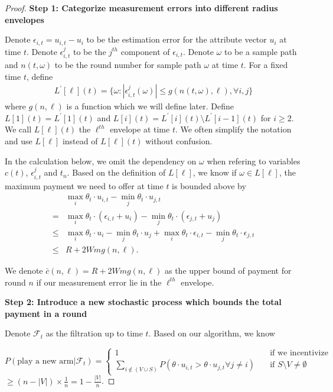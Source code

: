 \begin{proof}

\noindent\textbf{Step 1: Categorize measurement errors into different radius envelopes}


Denote $\epsilon_{i,t}=u_{i,t}-u_{i}$ to be the estimation error for the attribute vector $u_i$ at time $t$. Denote $\epsilon_{i,t}^{j}$ to be the $j^{th}$ component of $\epsilon_{i,t}$. Denote $\omega$ to be a sample path and $n(t,\omega)$ to be the round number for sample path $\omega$ at time $t$. For a fixed time $t$, define
\begin{align}
L^{'}[\ell](t) = \{\omega:|\epsilon_{i,t}^{j}(\omega)|\leq g(n(t,\omega),\ell), \forall i,j\}\nonumber
\end{align}
where $g(n,\ell)$ is a function which we will define later. Define $L[1](t) = L^{'}[1](t)$ and $L[i](t) = L^{'}[i](t)\setminus L^{'}[i-1](t)$ for $i\geq 2$. We call $L[\ell](t)$ the $\ell^{th}$ envelope at time $t$. We often simplify the notation and use $L[\ell]$ instead of $L[\ell](t)$ without confusion.

In the calculation below, we omit the dependency on $\omega$ when refering to variables $c(t)$, $\epsilon_{i,t}^{j}$ and $t_n$. Based on the definition of $L[\ell]$, we know if $\omega\in L[\ell]$, the maximum payment we need to offer at time $t$ is bounded above by 
\begin{align}
&\max_{i}\theta_t\cdot u_{i,t} - \min_{j}\theta_t\cdot u_{j,t} \nonumber \\
= &\max_{i}\theta_t\cdot (\epsilon_{i,t}+u_i) - \min_{j}\theta_t\cdot (\epsilon_{j,t}+u_j) \nonumber \\
\leq &\max_{i}\theta_t\cdot u_i - \min_{j}\theta_t\cdot u_j +\max_{i}\theta_t\cdot \epsilon_{i,t} - \min_{j}\theta_t\cdot \epsilon_{j,t}\nonumber \\
\leq & R + 2Wmg(n,\ell). \nonumber
\end{align}

We denote $\bar{c}(n,\ell)=R + 2Wmg(n,\ell)$ as the upper bound of payment for round $n$ if our measurement error lie in the $\ell^{th}$ envelope.


\noindent\textbf{Step 2: Introduce a new stochastic process which bounds the total payment in a round}

Denote $\mathcal{F}_t$ as the filtration up to time $t$. Based on our algorithm, we know

\[ P(\text{play a new arm}|\mathcal{F}_t) =
\begin{cases}
1       & \quad \text{if we incentivize}\\
\sum_{i\notin (V\cup S)} P(\theta \cdot u_{i,t}>\theta\cdot u_{j,t} \forall j\neq i)  & \quad \text{if }  S\setminus V\neq \emptyset 
\end{cases} \label{dom_stoc}
\] 
\hspace{1cm}$\geq (n-|V|)\times \frac{1}{n}=1-\frac{|V|}{n}$.


\end{proof}
